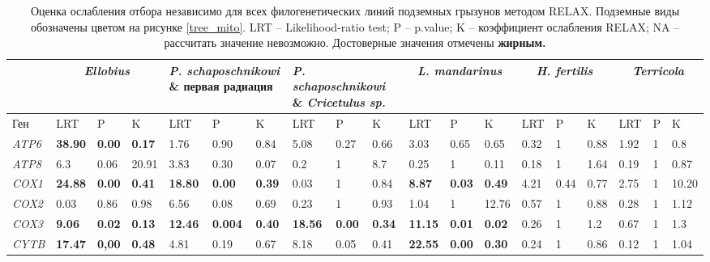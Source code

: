 \begin{landscape}

\begin{table}[]
	\caption{Оценка ослабления отбора независимо для всех филогенетических линий подземных грызунов методом RELAX. Подземные виды обозначены цветом на рисунке \ref{tree_mito}. LRT -- Likelihood-ratio test; P -- p.value; K -- коэффициент ослабления RELAX; NA -- рассчитать значение невозможно. Достоверные значения отмечены \textbf{жирным.} }\label{MT_relax} \vspace{5mm}
	
	\addtolength{\tabcolsep}{-3.5pt}
	\begin{tabular}{|l|l|l|l|l|l|l|l|l|l|l|l|l|l|l|l|l|l|l|}
		\hline
		& \multicolumn{3}{c|}{\textit{Ellobius}} & \multicolumn{3}{p{4cm}|}{\textit{P. schaposchnikowi} \& первая радиация} & \multicolumn{3}{p{4cm}|}{\textit{P. schaposchnikowi} \& \textit{Cricetulus sp.}} & \multicolumn{3}{c|}{\textit{L. mandarinus}} & \multicolumn{3}{c|}{\textit{H. fertilis}} & \multicolumn{3}{c|}{\textit{Terricola}} \\ \hline
		Ген & LRT & P & K & LRT & P & K & LRT & P & K & LRT & P & K & LRT & P & K & LRT & P & K \\ \hline
		\textit{ATP6} & \textbf{38.90} & \textbf{0.00} & \textbf{0.17} & 1.76 & 0.90 & 0.84 & 5.08 & 0.27 & 0.66 & 3.03 & 0.65 & 0.65 & 0.32 & 1 & 0.88 & 1.92 & 1 & 0.8 \\ \hline
		\textit{ATP8} & 6.3 & 0.06 & 20.91 & 3.83 & 0.30 & 0.07 & 0.2 & 1 & 8.7 & 0.25 & 1 & 0.11 & 0.18 & 1 & 1.64 & 0.19 & 1 & 0.87 \\ \hline
		\textit{COX1} & \textbf{24.88} & \textbf{0.00} & \textbf{0.41} & \textbf{18.80} & \textbf{0.00} & \textbf{0.39} & 0.03 & 1 & 0.84 & \textbf{8.87} & \textbf{0.03} & \textbf{0.49} & 4.21 & 0.44 & 0.77 & 2.75 & 1 & 10.20 \\ \hline
		\textit{COX2} & 0.03 & 0.86 & 0.98 & 6.56 & 0.08 & 0.69 & 0.23 & 1 & 0.93 & 1.04 & 1 & 12.76 & 0.57 & 1 & 0.88 & 0.28 & 1 & 1.12 \\ \hline
		\textit{COX3} & \textbf{9.06} & \textbf{0.02} & \textbf{0.13} & \textbf{12.46} & \textbf{0.004} & \textbf{0.40} & \textbf{18.56} & \textbf{0.00} & \textbf{0.34} & \textbf{11.15} & \textbf{0.01} & \textbf{0.02} & 0.26 & 1 & 1.2 & 0.67 & 1 & 1.3 \\ \hline
		\textit{CYTB} & \textbf{17.47} & \textbf{0,00} & \textbf{0.48} & 4.81 & 0.19 & 0.67 & 8.18 & 0.05 & 0.41 & \textbf{22.55} & \textbf{0.00} & \textbf{0.30} & 0.24 & 1 & 0.86 & 0.12 & 1 & 1.04 \\ \hline

\end{tabular}
\end{table}
\end{landscape}
